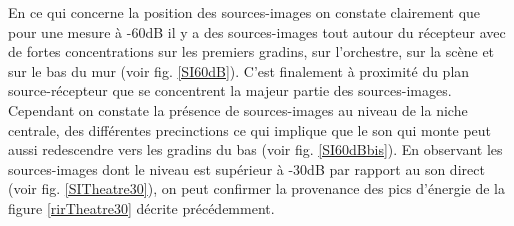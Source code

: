 %
En ce qui concerne la position des sources-images on constate clairement que pour une mesure à -60dB il y a des sources-images tout autour du récepteur avec de fortes concentrations sur les premiers gradins, sur l'orchestre, sur la scène et sur le bas du mur (voir fig. \ref{SI60dB}). C'est finalement à proximité du plan source-récepteur que se concentrent la majeur partie des sources-images. Cependant on constate la présence de sources-images au niveau de la niche centrale, des différentes \glspl{precinction} ce qui implique que le son qui monte peut aussi redescendre vers les gradins du bas (voir fig. \ref{SI60dBbis}). En observant les sources-images dont le niveau est supérieur à -30dB par rapport au son direct (voir fig. \ref{SITheatre30}), on peut confirmer la provenance des pics d'énergie de la figure \ref{rirTheatre30} décrite précédemment. 

